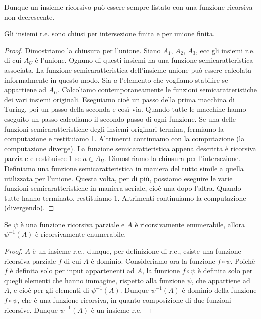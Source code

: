 Dunque un insieme ricorsivo pu\`o essere sempre listato con una funzione ricorsiva non decrescente. 

\begin{thm}
Gli insiemi r.e. sono chiusi per intersezione finita e per unione finita.
\end{thm}
 
\begin{proof}
Dimostriamo la chiusura per l'unione. Siano $A_{1}$, $A_{2}$, $A_{3}$, ecc gli insiemi r.e. di cui $A_{U}$ \`e l'unione. Ognuno di questi insiemi ha una funzione semicaratteristica associata. La funzione semicaratteristica dell'insieme unione pu\`o essere calcolata informalmente in questo modo. Sia $a$ l'elemento che vogliamo stabilire se appartiene ad $A_{U}$. Calcoliamo contemporaneamente le funzioni semicaratteristiche dei vari insiemi originali. Eseguiamo cio\`e un passo della prima macchina di Turing, poi un passo della seconda e cos\`i via. Quando tutte le macchine hanno eseguito un passo calcoliamo il secondo passo di ogni funzione. Se una delle funzioni semicaratteristiche degli insiemi originari termina, fermiamo la computazione e restituiamo 1. Altrimenti continuamo con la computazione (la computazione diverge). La funzione semicaratteristica appena descritta \`e ricorsiva parziale e restituisce 1 se $a\in A_{U}$.
Dimostriamo la chiusura per l'intersezione. Definiamo una funzione semicaratteristica in maniera del tutto simile a quella utilizzata per l'unione. Questa volta, per di pi\`u, possiamo eseguire le varie funzioni semicaratteristiche in maniera seriale, cio\`e una dopo l'altra. Quando tutte hanno terminato, restituiamo 1. Altrimenti continuiamo la computazione (divergendo).
\end{proof}

\begin{thm}
Se $\psi$ \`e una funzione ricorsiva parziale e $A$ \`e ricorsivamente
enumerabile, allora $\psi^{-1}(A)$ \`e ricorsivamente enumerabile.
\end{thm}

\begin{proof}

$A$ \`e un insieme r.e., dunque, per definizione di r.e., esiste una funzione ricorsiva parziale $f$ di cui $A$ \`e dominio. Consideriamo ora la funzione $f \circ \psi$. Poich\`e $f$ \`e definita solo per input appartenenti ad $A$, la funzione $f \circ \psi$ \`e definita solo per quegli elementi che hanno immagine, rispetto alla funzione $\psi$, che appartiene ad $A$, e cio\`e per gli elementi di $\psi^{-1}(A)$. Dunque $\psi^{-1}(A)$ \`e dominio della funzione $f \circ \psi$, che \`e una funzione ricorsiva, in quanto composizione di due funzioni ricorsive. Dunque $\psi^{-1}(A)$ \`e un insieme r.e.  

\end{proof}

